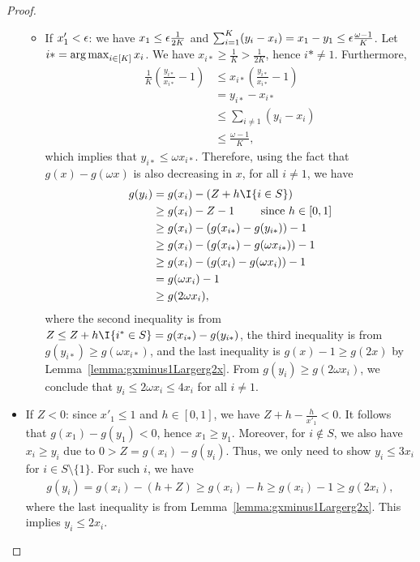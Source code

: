 \begin{proof}
\begin{itemize}
\begin{itemize}
            \item If $x'_1 < {\epsilon}$: we have $x_1 \leq {\epsilon} \frac{1}{2K}$ and $\sum_{i=1}^K (y_i - x_i) = x_1 - y_1 \leq {\epsilon} \frac{\omega-1}{K}$. Let $i* = \operatorname*{arg\,max}_{i \in [K]}x_i$. We have $x_{i*} \geq \frac{1}{K} > \frac{1}{2K}$, hence $i* \neq 1$. Furthermore,
            \begin{align*}
                \frac{1}{K}\left(\frac{y_{i*}}{x_{i*}} - 1\right) &\leq x_{i*}\left(\frac{y_{i*}}{x_{i*}} - 1\right) \\ 
                &= y_{i*} - x_{i*} \\
                &\leq \sum_{i \neq 1}(y_i - x_i) \\
                &\leq \frac{\omega-1}{K},
            \end{align*}
            which implies that $y_{i*} \leq \omega x_{i*}$. Therefore, using the fact that $g(x) - g(\omega x)$ is also decreasing in $x$, for all $i \neq 1$, we have
            \begin{align*}
                g(y_i) &= g(x_i) - (Z + h\I{i \in S}) \\
                &\geq g(x_i) - Z - 1 \qquad\text{ since } h \in [0,1]\\
                &\geq g(x_i) - (g(x_{i*}) - g(y_{i*})) - 1 \\
                &\geq g(x_i) - (g(x_{i*}) - g(\omega x_{i*})) - 1 \\
                &\geq g(x_i) - (g(x_i) - g(\omega x_i)) - 1 \\
                &= g(\omega x_i) - 1 \\
                &\geq g(2\omega x_i),
            \end{align*}
            where the second inequality is from $Z \leq Z + h\I{i^* \in S} = g(x_{i*}) - g(y_{i*})$, the third inequality is from $g(y_{i*}) \geq g(\omega x_{i*})$, and the last inequality is $g(x) - 1 \geq g(2x)$ by Lemma~\ref{lemma:gxminus1Largerg2x}.
            From $g(y_i) \geq g(2\omega x_i)$, we conclude that $y_i \leq 2\omega x_i \leq 4x_i$ for all $i \neq 1$.
        \end{itemize} 
        \item If $Z < 0$: since $x'_1 \leq 1$ and $h \in [0,1]$, we have $Z + h - \frac{h}{x'_1} < 0$. It follows that $g(x_1) - g(y_1) < 0$, hence $x_1 \geq y_1$. Moreover, for $i \notin S$, we also have $x_i \geq y_i$ due to $0 > Z = g(x_i) - g(y_i)$. Thus, we only need to show $y_i \leq 3x_i$ for $i \in S \setminus \{1\}$. For such $i$, we have 
        \begin{align*}
            g(y_i) = g(x_i) - (h + Z) \geq g(x_i) - h \geq g(x_i) - 1 \geq g(2x_i),
        \end{align*}
        where the last inequality is from Lemma~\ref{lemma:gxminus1Largerg2x}. This implies $y_i \leq 2x_i$.
    \end{itemize}
\end{proof}
